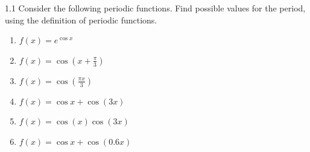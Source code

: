 
\begin{problem}{1.1}
  Consider the following periodic functions.
  Find possible values for the period, using the definition of periodic functions.

  \begin{enumerate}[label=\alph*)]
    \item $f(x) = e^{\cos x}$
    \item $f(x) = \cos \left( x + \frac{\pi}{3} \right)$
    \item $f(x) = \cos \left( \frac{\pi x}{3} \right)$
    \item $f(x) = \cos x + \cos (3x)$
    \item $f(x) = \cos(x)\cos(3x)$
    \item $f(x) = \cos x + \cos(\num{0,6} x)$
  \end{enumerate}
\end{problem}


